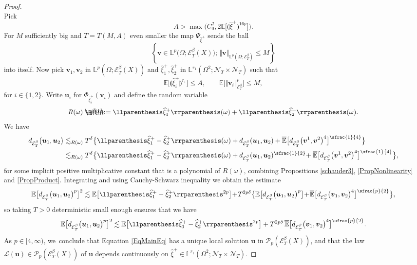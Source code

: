 \documentclass[10pt]{amsart}
\makeatletter
\theoremstyle{definition}
\newcommand\bbE{\mathbb{E}}
\newcommand{\mcE}{\mathcal{E}}
\newcommand{\mcL}{\mathcal{L}}
\newcommand{\mcN}{\mathcal{N}}
\newcommand{\mcP}{\mathcal{P}}
\newcommand{\bbL}{\mathbb{L}}
\newcommand{\bsu}{\boldsymbol{u}}
\newcommand{\bsv}{\boldsymbol{v}}
\newcommand*{\defeq}{\mathrel{\rlap{%
\raisebox{0.3ex}{$\m@th\cdot$}}%
\raisebox{-0.3ex}{$\m@th\cdot$}}%
=}
\newcommand{\dab}{\mcE^\beta_T}
\newcommand{\norme}[1]{\Vert #1 \Vert}
\makeatother
\begin{document}
\begin{proof}
\[\]
Pick
\[
A > \max\bigl(C_0^2, 2\bbE\bigl[\llparenthesis\widehat\xi^+\rrparenthesis^{16p}\bigr]\bigr).
\]
For $M$ sufficiently big and $T=T(M,A)$ even smaller the map $\Psi_{\widehat\xi^+}$ sends the ball
\[
\left\{ \bsv \in \bbL^p\bigl(\Omega; \dab(X)\bigr);\, \norme{\bsv}_{\bbL^p(\Omega; \dab)}\leq M\right\}
\]
into itself. Now pick $\bsv_1, \bsv_2$ in $\bbL^p(\Omega; \dab(X))$ and $\widehat\xi^+_1, \widehat\xi^+_2$ in $\bbL^{r_1}(\Omega^2; {{\boldsymbol{\mcN}}_T}\times{{\boldsymbol{\mcN}}_T})$ such that
\[
\bbE\bigl[\llparenthesis\widehat\xi^+_i\rrparenthesis^{r_1}\bigr] \leq A, \qquad \overline{\bbE}\bigl[\norme{\bsv_i}_{\dab}^p\bigr] \leq M,
\]
for $i\in\{1,2\}$. Write $\bsu_i$ for $\Phi_{\widehat\xi^+_i}(\bsv_i)$ and define the random variable
\[
R(\omega) \defeq \llparenthesis \widehat\xi^+_1\rrparenthesis(\omega) + \llparenthesis \widehat\xi^+_2\rrparenthesis(\omega).
\]
We have
\begin{equation*} \begin{split}
d_{\mcE_T^\beta}\bigl(\bsu_1, \bsu_2\bigr) &\lesssim_{R(\omega)} T^\delta \bigl\{ \llparenthesis \widehat\xi^+_1 - \widehat\xi^+_2\rrparenthesis(\omega) + d_{\mcE^\beta_T}(\bsu_1, \bsu_2) + \overline{\bbE}\bigl[d_{\dab}{\bigl(\bsv^1, \bsv^2\bigr)^4}\bigr]^{\sfrac{1}{4}} \bigr\}
\\
& \lesssim_{R(\omega)} T^\delta \bigl\{ \llparenthesis \widehat\xi^+_1 - \widehat\xi^+_2\rrparenthesis(\omega) + d_{\mcE^\beta_T}(\bsu_1, \bsu_2)^{\sfrac{1}{2}}\hspace{-2pt} + \overline{\bbE}\bigl[d_{\dab}{\bigl(\bsv^1,\bsv^2\bigr)^4}\bigr]^{\sfrac{1}{4}} \bigr\},
\end{split} \end{equation*}
for some implicit positive multiplicative constant that is a polynomial of $R(\omega)$, combining Propositions \ref{schauder3}, \ref{PropNonlinearity} and \ref{PropProduct}. Integrating and using Cauchy-Schwarz inequality we obtain the estimate
\begin{align*}
\bbE\bigl[d_{\mcE_T^\beta}\bigl(\bsu_1, \bsu_2\bigr)^p \bigr]^2 \lesssim \bbE\bigl[ \llparenthesis \widehat\xi^+_1 - \widehat\xi^+_2\rrparenthesis^{2p}\bigr] \!+\! T^{2p\delta} \bigl\{ \bbE\bigl[ d_{\mcE_T^\beta}\bigl(\bsu_1, \bsu_2\bigr)^{p} \bigr] \!+\! \overline{\bbE}\bigl[d_{\dab}\bigl(\bsv_1, \bsv_2\bigr)^4\bigr]^{\sfrac{p}{2}} \bigr\},
\end{align*}
so taking $T>0$ deterministic small enough ensures that we have
\begin{align*}
\bbE\bigl[ d_{\mcE_T^\beta}\bigl(\bsu_1, \bsu_2\bigr)^{p} \bigr]^2 \lesssim \bbE\bigl[ \llparenthesis \widehat\xi^+_1 - \widehat\xi^+_2\rrparenthesis^{2p}\bigr] + T^{2p\delta} \, \overline{\bbE}\bigl[d_{\dab}\bigl(\bsv_1, \bsv_2\bigr)^4\bigr]^{\sfrac{p}{2}}.
\end{align*}
As $p\in[4,\infty)$, we~conclude that Equation \eqref{EqMainEq} has a unique local solution $\bsu$ in $\mcP_p(\dab(X))$, and that the law $\mcL(\bsu) \in \mcP_p(\dab(X))$ of $\bsu$ depends continuously on $\widehat\xi^+\in \bbL^{r_1}(\Omega^2; {{\boldsymbol{\mcN}}_T}\times{{\boldsymbol{\mcN}}_T})$.


\end{proof}
\end{document}
